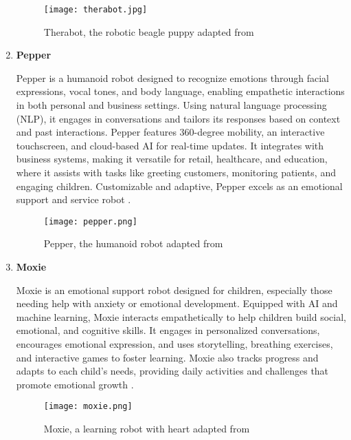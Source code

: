 \begin{enumerate}
\begin{figure}[ht]
    \centering
    \texttt{[image: therabot.jpg]}
    \caption{Therabot, the robotic beagle puppy adapted from \cite{therabot2024}}
    \label{fig:therabot}
\end{figure}

\newpage
\item{\bf{Pepper}}
\vspace{0.25cm}

Pepper is a humanoid robot designed to recognize emotions through facial expressions, vocal tones, and body language, enabling empathetic interactions in both personal and business settings. Using natural language processing (NLP), it engages in conversations and tailors its responses based on context and past interactions. Pepper features 360-degree mobility, an interactive touchscreen, and cloud-based AI for real-time updates. It integrates with business systems, making it versatile for retail, healthcare, and education, where it assists with tasks like greeting customers, monitoring patients, and engaging children. Customizable and adaptive, Pepper excels as an emotional support and service robot \cite{softbank2022}.

\begin{figure}[ht]
    \centering
    \texttt{[image: pepper.png]}
    \caption{Pepper, the humanoid robot adapted from \cite{pepper2014}}
    \label{fig:pepper}
\end{figure}

\newpage
\item{\bf{Moxie}}
\vspace{0.25cm}

Moxie is an emotional support robot designed for children, especially those needing help with anxiety or emotional development. Equipped with AI and machine learning, Moxie interacts empathetically to help children build social, emotional, and cognitive skills. It engages in personalized conversations, encourages emotional expression, and uses storytelling, breathing exercises, and interactive games to foster learning. Moxie also tracks progress and adapts to each child’s needs, providing daily activities and challenges that promote emotional growth \cite{hurst2020}.

\begin{figure}[ht]
    \centering
    \texttt{[image: moxie.png]}
    \caption{Moxie, a learning robot with heart adapted from \cite{moxie2020}}
    \label{fig:moxie}
\end{figure}

\end{enumerate}
\newpage
